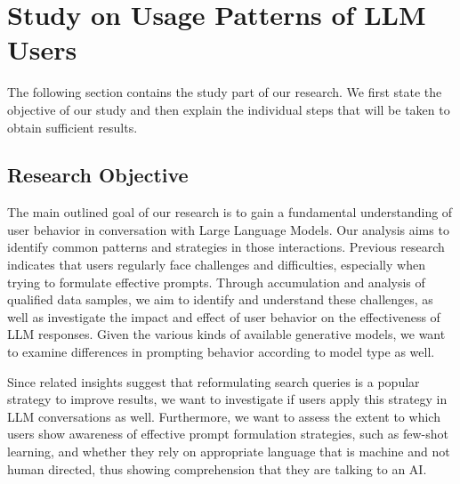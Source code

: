 \usepackage{hyperref}%
\section{Study on Usage Patterns of LLM Users}
\label{sec:study-on-usage-patterns-of-llm-users}
The following section contains the study part of our research.
We first state the objective of our study and then explain the individual steps that will be
taken to obtain sufficient results.
\subsection{Research Objective}
\label{subsec:research-objective}
The main outlined goal of our research is to gain a fundamental understanding of user behavior in conversation with Large Language Models.
Our analysis aims to identify common patterns and strategies in those interactions.
Previous research indicates that users regularly face challenges and difficulties, especially
when trying to formulate effective prompts.
Through accumulation and analysis of qualified data samples, we aim to identify and understand these
challenges,
as well as investigate the impact and effect of user behavior on the effectiveness of LLM responses.
Given the various kinds of available generative models, we want to examine differences in
prompting behavior according to model type as well.

Since related insights suggest that reformulating search queries is a popular strategy to improve
results, we want to investigate if users apply this strategy in LLM conversations as well. %
Furthermore, we want to assess the extent to which users show awareness of effective prompt
formulation strategies, such as few-shot learning, and whether they rely on appropriate language
that is machine and not human directed, thus showing comprehension that they are talking to an AI\@.

